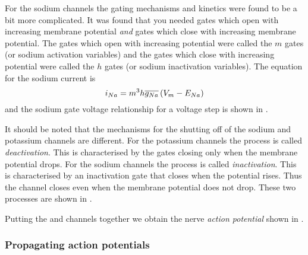 For the sodium channels the gating mechanisms and kinetics were found to be a
bit more complicated. It was found that you needed gates which open with
increasing membrane potential \emph{and} gates which close with increasing
membrane potential. The gates which open with increasing potential were called
the $m$ gates (or sodium activation variables) and the gates which close with
increasing potential were called the $h$ gates (or sodium inactivation
variables). The equation for the sodium current is
\begin{equation}
  i_{Na}=m^{3}h\overline{g_{Na}}\left( V_{m} - E_{Na} \right)
\end{equation}
and the sodium gate voltage relationship for a voltage step is shown in
.


It should be noted that the mechanisms for the shutting off of the sodium and
potassium channels are different. For the potassium channels the process is
called \emph{deactivation}. This is characterised by the gates closing only
when the membrane potential drops. For the sodium channels the process is
called \emph{inactivation}. This is characterised by an inactivation gate that
closes when the potential rises. Thus the channel closes even when the
membrane potential does not drop. These two processes are shown in
.


Putting the  and  channels together we obtain the nerve
\emph{action potential} shown in .


\subsubsection{Propagating action potentials}

